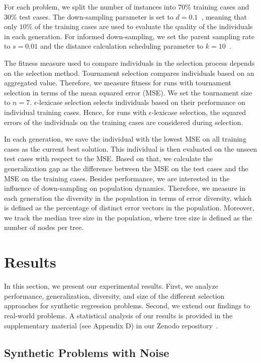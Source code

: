 \documentclass[runningheads]{llncs}
\begin{document}
For each problem, we split the number of instances into $70\%$ training cases and $30\%$ test cases. The down-sampling parameter is set to $d=0.1$~\cite{geiger.2023}, meaning that only $10\%$ of the training cases are used to evaluate the quality of the individuals in each generation. For informed down-sampling, we set the parent sampling rate to $s=0.01$ and the distance calculation scheduling parameter to $k=10$~\cite{boldi2024informed}.

The fitness measure used to compare individuals in the selection process depends on the selection method. Tournament selection compares individuals based on an aggregated value. Therefore, we measure fitness for runs with tournament selection in terms of the mean squared error (MSE). We set the tournament size to $n=7$. $\epsilon$-lexicase selection selects individuals based on their performance on individual training cases. Hence, for runs with $\epsilon$-lexicase selection, the squared errors of the individuals on the training cases are considered during selection. 

In each generation, we save the individual with the lowest MSE on all training cases as the current best solution. This individual is then evaluated on the unseen test cases with respect to the MSE. Based on that, we calculate the generalization gap as the difference between the MSE on the test cases and the MSE on the training cases. Besides performance, we are interested in the influence of down-sampling on population dynamics. Therefore, we measure in each generation the diversity in the population in terms of error diversity, which is defined as the percentage of distinct error vectors in the population. Moreover, we track the median tree size in the population, where tree size is defined as the number of nodes per tree.


\section{Results}
\label{sec:results}

In this section, we present our experimental results. First, we analyze performance, generalization, diversity, and size of the different selection approaches for synthetic regression problems. Second, we extend our findings to real-world problems. A statistical analysis of our results is provided in the supplementary material (see Appendix D) in our Zenodo repository~\cite{zenodo}.

\subsection{Synthetic Problems with Noise}
\label{subsec:results_synthetic}
\end{document}
